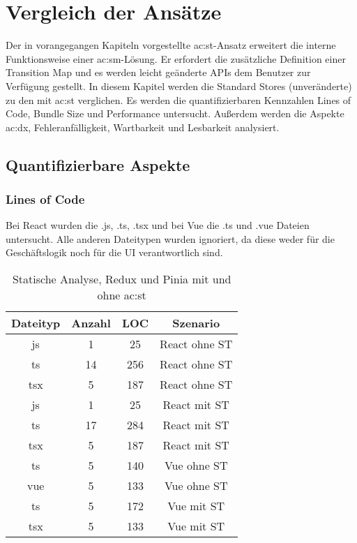 \chapter{Vergleich der Ansätze} \label{vergleich}

Der in vorangegangen Kapiteln vorgestellte \acrlong{ac:st}-Ansatz erweitert die interne Funktionsweise einer \acrlong{ac:sm}-Lösung. Er erfordert die zusätzliche Definition einer Transition Map und es werden leicht geänderte APIs dem Benutzer zur Verfügung gestellt. In diesem Kapitel werden die Standard Stores (unveränderte) zu den mit \acrlong{ac:st} verglichen. Es werden die quantifizierbaren Kennzahlen Lines of Code, Bundle Size und Performance untersucht. Außerdem werden die Aspekte \acrlong{ac:dx}, Fehleranfälligkeit, Wartbarkeit und Lesbarkeit analysiert.

\section{Quantifizierbare Aspekte}
\subsection{Lines of Code}

Bei React wurden die .js, .ts, .tsx und bei Vue die .ts und .vue Dateien untersucht. Alle anderen Dateitypen wurden ignoriert, da diese weder für die Geschäftslogik noch für die UI verantwortlich sind.

\begin{table}[!ht]
  \caption{Statische Analyse, Redux und Pinia mit und ohne \acrshort{ac:st}}
  \label{tab:staticAnalysisSTvsNoST}

  \begin{center}
    \begin{tabular}{|c|c|c|c|} 
    \hline
    Dateityp & Anzahl & LOC & Szenario \\ [0.5ex] 
    \hline\hline
    js & 1 & 25 & React ohne ST \\ 
    \hline
    ts & 14 & 256 & React ohne ST \\
    \hline
    tsx & 5 & 187 & React ohne ST \\
    \hline\hline
    js & 1 & 25 & React mit ST \\ 
    \hline
    ts & 17 & 284 & React mit ST \\
    \hline
    tsx & 5 & 187 & React mit ST \\
    \hline\hline
    ts & 5 & 140 & Vue ohne ST \\
    \hline
    vue & 5 & 133 & Vue ohne ST \\
    \hline\hline
    ts & 5 & 172 & Vue mit ST \\
    \hline
    tsx & 5 & 133 & Vue mit ST \\
    \hline
    \end{tabular}
  \end{center}
\end{table}

